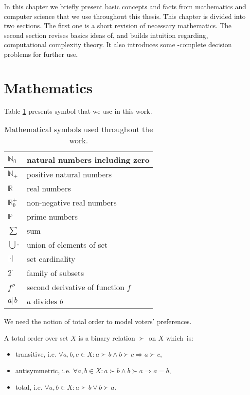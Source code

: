 In this chapter we briefly present basic concepts and facts from mathematics and computer science
that we use throughout this thesis.
This chapter is divided into two sections.
The first one is a short revision of necessary mathematics.
The second section revises basics ideas of, and builds intuition regarding, computational complexity theory.
It also introduces some \np-complete decision problems for further use.


\section{Mathematics}

Table \ref{symbols} presents symbol that we use in this work.

\begin{table} \centering
\begin{tabular}{| l | l |} \hline
	$\mathbb{N}_0$	& natural numbers including zero \\ \hline
	$\mathbb{N}_+$	& positive natural numbers \\ \hline
	$\mathbb{R}$	& real numbers \\ \hline
	$\mathbb{R}_0^+$& non-negative real numbers \\ \hline
	$\mathbb{P}$	& prime numbers \\ \hline
	$\sum$			& sum \\ \hline 
	$\bigcup \cdot$	& union of elements of set\\ \hline
	$\left\vert \cdot \right\vert$	& set cardinality \\ \hline
	$2^\cdot$		& family of subsets \\ \hline
	$f''$			& second derivative of function $f$ \\ \hline
  	$ a | b$        & $a$ divides $b$ \\ \hline
\end{tabular}
\caption{Mathematical symbols used throughout the work.} \label{symbols}
\end{table}

We need the notion of total order to model voters' preferences.

\begin{defn}
A total order over set $X$ is a binary relation $\succ$ on $X$ which~is:
\begin{itemize}
	\item transitive, i.e. $\forall a,b,c \in X: a \succ b \land b \succ c \Rightarrow a \succ c$,
	\item antisymmetric, i.e. $\forall a,b \in X: a \succ b \land b \succ a \Rightarrow a=b $,
	\item total, i.e. $\forall a,b \in X: a \succ b \lor b \succ a$.
\end{itemize}
\end{defn}

